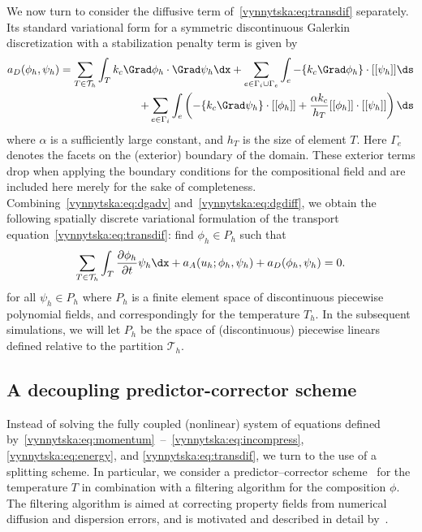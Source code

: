 We now turn to consider the diffusive term
of~\eqref{vynnytska:eq:transdif} separately. Its standard variational
form for a symmetric discontinuous Galerkin discretization with a
stabilization penalty term is given by~\citep{Arnold1982,
  KulkarniRovasTortorelli2007}
\begin{equation}
  \label{vynnytska:eq:dgdiff}
  \begin{split}
    a_D(\phi_h, \psi_h)
    =
    \sum_{T \in \mathcal{T}_h} \int_T k_c \Grad \phi_h \cdot \Grad \psi_h \dx
    + \sum_{e \in \Gamma_i \cup \Gamma_e}
    \int_{e} - \avg{k_c \Grad \phi_h} \cdot \jump{\psi_h} \ds \\
    + \sum_{e \in \Gamma_i} \int_{e} \left(
    - \{ k_c \Grad \psi_h\} \cdot \jump{\phi_h}
    + \frac{\alpha k_c}{h_T} \jump{\phi_h} \cdot \jump{\psi_h}
    \right) \ds
  \end{split}
\end{equation}
where $\alpha$ is a sufficiently large constant, and $h_T$ is the size
of element $T$. Here $\Gamma_e$ denotes the facets on the (exterior)
boundary of the domain. These exterior terms drop when applying the
boundary conditions for the compositional field and are included here
merely for the sake of completeness.
Combining~\eqref{vynnytska:eq:dgadv} and~\eqref{vynnytska:eq:dgdiff},
we obtain the following spatially discrete variational formulation of
the transport equation~\eqref{vynnytska:eq:transdif}: find
$\phi_h \in P_h$ such that
\begin{equation}
  \label{vynnytska:eq:semi_composition}
  \sum_{T \in \mathcal{T}_h} \int_T \frac{\partial \phi_h}{\partial t}\psi_h\dx
  + a_{A} (u_h; \phi_h, \psi_h) + a_D(\phi_h, \psi_h) = 0.
\end{equation}
for all $\psi_h \in P_h$ where $P_h$ is a finite element space of
discontinuous piecewise polynomial fields, and correspondingly for the
temperature $T_h$. In the subsequent simulations, we will let $P_h$ be
the space of (discontinuous) piecewise linears defined relative to the
partition $\mathcal{T}_h$.

\subsection{A decoupling predictor-corrector scheme}

Instead of solving the fully coupled (nonlinear) system of equations
defined
by~\eqref{vynnytska:eq:momentum}~--~\eqref{vynnytska:eq:incompress},
\eqref{vynnytska:eq:energy}, and \eqref{vynnytska:eq:transdif}, we
turn to the use of a splitting scheme. In particular, we consider a
predictor--corrector scheme~\citep{BergKekenYuen1993, HansenEbel1988}
for the temperature $T$ in combination with a filtering algorithm for
the composition $\phi$. The filtering algorithm is aimed at
correcting property fields from numerical diffusion and dispersion
errors, and is motivated and described in detail
by~\citet{LenardicKaula1993}.

